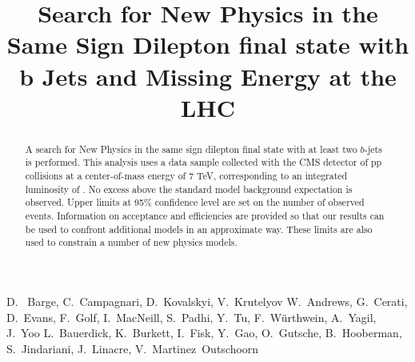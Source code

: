 \documentclass{cmspaper}
\begin{document}
%
\begin{titlepage}
\title{Search for New Physics in the Same Sign Dilepton final state with b Jets and Missing Energy at the LHC}

  \begin{Authlist}
    D.~ Barge, C.~Campagnari, D.~Kovalskyi, V.~Krutelyov
    W.~Andrews, G.~Cerati, D.~Evans, F.~Golf, I.~MacNeill, S.~Padhi, Y.~Tu, F.~W\"urthwein, A.~Yagil, J.~Yoo
    L.~Bauerdick, K.~Burkett, I.~Fisk, Y.~Gao, O.~Gutsche, B.~Hooberman, S.~Jindariani, J.~Linacre,
    V.~Martinez~Outschoorn
  \end{Authlist}

\begin{abstract}
A search for New Physics in the same sign dilepton final state with at least two $b$-jets is performed. 
This analysis uses a data sample collected with the CMS detector
of pp collisions at a center-of-mass energy of 7 TeV, corresponding to an integrated
luminosity of \intLumi. 
No excess above the standard model background expectation is observed.
Upper limits at 95\% confidence level are set on the number of observed events.
Information on acceptance and efficiencies are provided so that our 
results can be used to confront additional models in an approximate way.
These limits are also 
used to constrain a number of new physics models.
\end{abstract}
\end{titlepage}


%
%











\clearpage


\clearpage
\appendix



\end{document}
